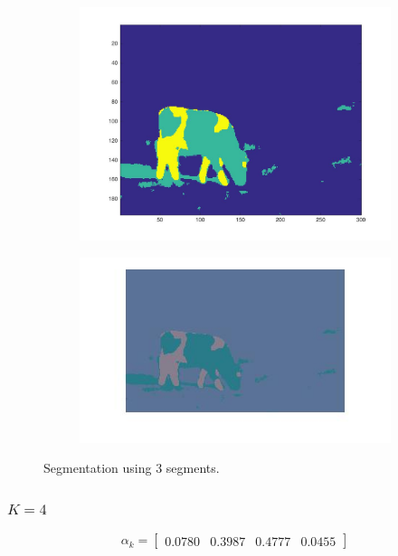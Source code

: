 \documentclass{ethz_report}
\begin{document}
\begin{figure}[h]
    \centering
    \begin{subfigure}[b]{.5\textwidth}
        \centering
        \includegraphics[width=1\linewidth]{images/seg_K_3}
    \end{subfigure}%
    \begin{subfigure}[b]{.5\textwidth}
        \centering
        \includegraphics[width=1\linewidth]{images/seg_K_3_color}
    \end{subfigure}
    \caption{Segmentation using 3 segments.}
    \label{fig:seg_k3}
\end{figure}

\subsubsection*{$K=4$}

\begin{equation}
    \alpha_k = \begin{bmatrix}
     0.0780 & 0.3987 & 0.4777 & 0.0455
    \end{bmatrix}
\end{equation}
\end{document}
